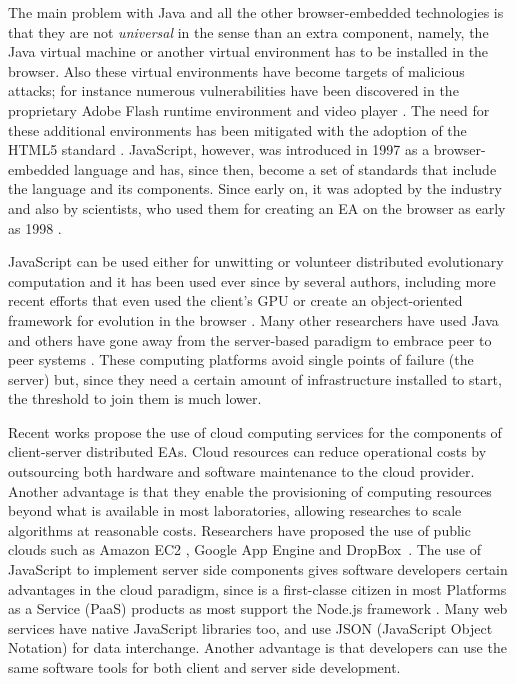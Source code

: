 \documentclass[journal,onecolumn]{IEEEtran}
\begin{document}
The main problem with Java and all the other browser-embedded
technologies is that they are not {\em universal} in the
sense than an extra component, namely, the Java virtual machine or another
virtual environment has to be installed in the browser.
Also these virtual environments have become targets of malicious attacks; %
for instance numerous vulnerabilities have been discovered in %
the proprietary Adobe Flash runtime environment and
video player \cite{ford2009analyzing,watanabe2010new}. The need for
these additional environments has been mitigated with the
adoption of the HTML5 standard \cite{anthes2012html5}.
JavaScript, however,
\cite{flanagan2006javascript} was introduced in 1997 as a
browser-embedded language and has, since then, become a set of standards
\cite{ECMA-262} that include the language and its components. Since
early on, it was adopted by the industry and also by scientists,
who used them for creating an EA on
the browser as early as 1998 \cite{jj-ppsn98}.

JavaScript can be used either for unwitting
\cite{unwitting-ec} or volunteer
\cite{langdon:2005:metas,gecco07:workshop:dcor} distributed
evolutionary computation and it has been used ever since by several
authors, including more recent efforts
\cite{Desell:2008:AHG:1389095.1389273,duda2013distributed,DBLP:journals/corr/abs-0801-1210}
that even
used the client's GPU \cite{duda2013gpu} or create an object-oriented
framework for evolution in the browser \cite{EvoStar2014:jsEO}. Many other researchers have
used Java \cite{chong:1999:jDGPi} and others have gone away from the
server-based paradigm to embrace peer to peer systems
\cite{jin2006constructing,10.1109/ICICSE.2008.99,DBLP:conf/3pgcic/GuervosMFEL12}. These computing
platforms avoid single points of failure (the server) but, since they
need a certain amount of infrastructure installed to start, the
threshold to join them is much lower.

Recent works propose the use of cloud computing services for the components of
client-server distributed EAs. Cloud resources
can reduce operational costs by outsourcing both hardware and software maintenance
to the cloud provider. Another advantage is that they enable the provisioning of computing resources beyond what
is available in most laboratories, allowing researches to
scale algorithms at reasonable costs. Researchers have proposed the use of
public clouds such as Amazon EC2 \cite{CloudScale}, Google App Engine\cite{di2013towards}
and DropBox~\cite{mericloud}. The use of JavaScript to implement
server side components
gives software developers certain advantages in the cloud
paradigm, since is a first-classe citizen
in most Platforms as a Service (PaaS) products as most support the Node.js
framework \cite{wood13:nodejs:paas}. Many web services
have native JavaScript libraries too, and use JSON (JavaScript Object Notation) for data
interchange. Another advantage is that
developers can use the same software tools for both client and server
side development.
\end{document}
